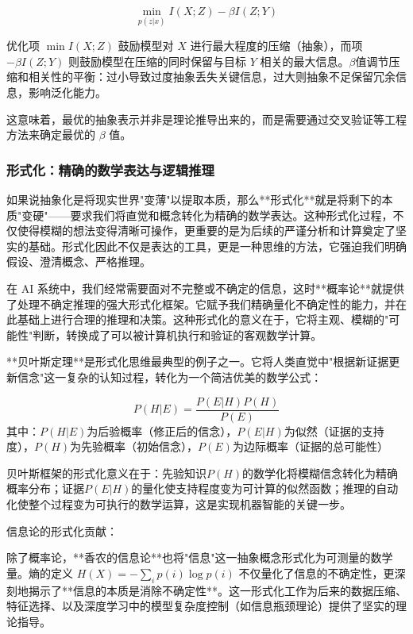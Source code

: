 $$\min_{p(z|x)} I(X;Z) - \beta I(Z;Y)$$

优化项 $\min I(X;Z)$ 鼓励模型对 $X$ 进行最大程度的压缩（抽象），而项 $-\beta I(Z;Y)$ 则鼓励模型在压缩的同时保留与目标 $Y$ 相关的最大信息。$\beta$值调节压缩和相关性的平衡：过小导致过度抽象丢失关键信息，过大则抽象不足保留冗余信息，影响泛化能力。

这意味着，最优的抽象表示并非是理论推导出来的，而是需要通过交叉验证等工程方法来确定最优的 $\beta$ 值。

\subsubsection{形式化：精确的数学表达与逻辑推理}

如果说抽象化是将现实世界"变薄"以提取本质，那么**形式化**就是将剩下的本质"变硬"——要求我们将直觉和概念转化为精确的数学表达。这种形式化过程，不仅使得模糊的想法变得清晰可操作，更重要的是为后续的严谨分析和计算奠定了坚实的基础。形式化因此不仅是表达的工具，更是一种思维的方法，它强迫我们明确假设、澄清概念、严格推理。

在 AI 系统中，我们经常需要面对不完整或不确定的信息，这时**概率论**就提供了处理不确定推理的强大形式化框架。它赋予我们精确量化不确定性的能力，并在此基础上进行合理的推理和决策。这种形式化的意义在于，它将主观、模糊的"可能性"判断，转换成了可以被计算机执行和验证的客观数学计算。

**贝叶斯定理**是形式化思维最典型的例子之一。它将人类直觉中"根据新证据更新信念"这一复杂的认知过程，转化为一个简洁优美的数学公式：

\begin{tcolorbox}[colback=green!5!white,colframe=green!75!black,title=经典形式化：贝叶斯定理]
$$P(H|E) = \frac{P(E|H)P(H)}{P(E)}$$
其中：$P(H|E)$为后验概率（修正后的信念），$P(E|H)$为似然（证据的支持度），$P(H)$为先验概率（初始信念），$P(E)$为边际概率（证据的总可能性）
\end{tcolorbox}

贝叶斯框架的形式化意义在于：先验知识$P(H)$的数学化将模糊信念转化为精确概率分布；证据$P(E|H)$的量化使支持程度变为可计算的似然函数；推理的自动化使整个过程变为可执行的数学运算，这是实现机器智能的关键一步。

信息论的形式化贡献：

除了概率论，**香农的信息论**也将"信息"这一抽象概念形式化为可测量的数学量。熵的定义 $H(X) = -\sum_{i} p(i) \log p(i)$ 不仅量化了信息的不确定性，更深刻地揭示了**信息的本质是消除不确定性**。这一形式化工作为后来的数据压缩、特征选择、以及深度学习中的模型复杂度控制（如信息瓶颈理论）提供了坚实的理论指导。

